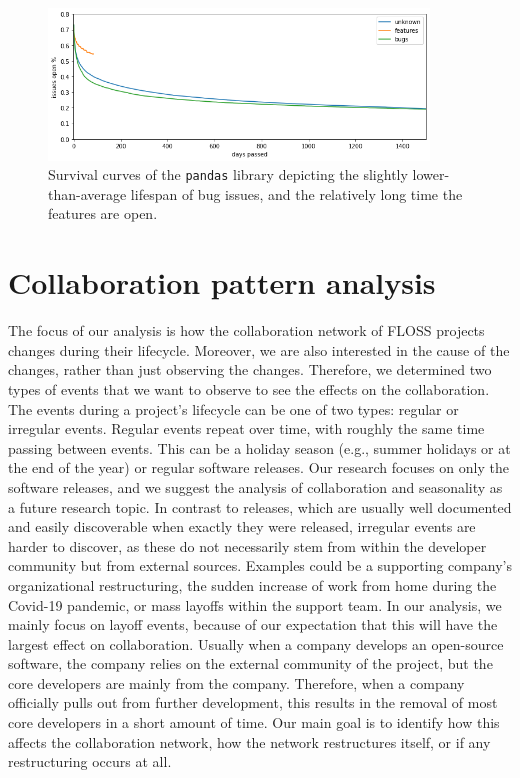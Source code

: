 \begin{figure}[!htbp]
    \centering
    \includegraphics[width=0.9\textwidth]{figures/issues_open.png}
    \caption{Survival curves of the \texttt{pandas} library depicting the slightly lower-than-average lifespan of bug issues, and the relatively long time the features are open.}
    \label{fig:survival}
\end{figure}


\section{Collaboration pattern analysis}
\label{sec:patterns}
The focus of our analysis is how the collaboration network of FLOSS projects changes during their lifecycle. Moreover, we are also interested in the cause of the changes, rather than just observing the changes. Therefore, we determined two types of events that we want to observe to see the effects on the collaboration. The events during a project's lifecycle can be one of two types: regular or irregular events. Regular events repeat over time, with roughly the same time passing between events. This can be a holiday season (e.g., summer holidays or at the end of the year) or regular software releases. Our research focuses on only the software releases, and we suggest the analysis of collaboration and seasonality as a future research topic. In contrast to releases, which are usually well documented and easily discoverable when exactly they were released, irregular events are harder to discover, as these do not necessarily stem from within the developer community but from external sources. Examples could be a supporting company's organizational restructuring, the sudden increase of work from home during the Covid-19 pandemic, or mass layoffs within the support team. In our analysis, we mainly focus on layoff events, because of our expectation that this will have the largest effect on collaboration. Usually when a company develops an open-source software, the company relies on the external community of the project, but the core developers are mainly from the company. Therefore, when a company officially pulls out from further development, this results in the removal of most core developers in a short amount of time. Our main goal is to identify how this affects the collaboration network, how the network restructures itself, or if any restructuring occurs at all. %


